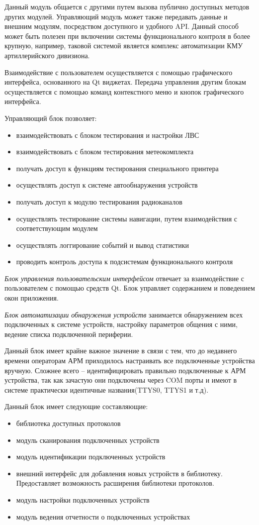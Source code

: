 Данный модуль общается с другими путем вызова публично доступных методов других модулей. Управляющий модуль может также
передавать данные и внешним модулям, посредством доступного и удобного API. Данный способ может быть полезен при
включении системы функционального контроля в более крупную, например, таковой системой является комплекс автоматизации
КМУ артиллерийского дивизиона.

Взаимодействие с пользователем осуществляется с помощью графического интерфейса, основанного на Qt виджетах. Передача
управления другим блокам осуществляется с помощью команд контекстного меню и кнопок графического интерфейса.

Управляющий блок позволяет:
\begin{itemize}
	\item взаимодействовать с блоком тестирования и настройки ЛВС
	\item взаимодействовать с блоком тестирования метеокомплекта
	\item получать доступ к функциям тестирования специального принтера
	\item осуществлять доступ к системе автообнаружения устройств
	\item получать доступ к модулю тестирования радиоканалов
	\item осуществлять тестирование системы навигации, путем взаимодействия с соответствующим модулем
	\item осуществлять логгирование событий и вывод статистики
	\item проводить контроль доступа к подсистемам функционального контроля
\end{itemize}

\textit{Блок управления пользовательским интерфейсом} отвечает за взаимодействие с пользователем с помощью средств Qt.
Блок управляет содержанием и поведением окон приложения.

\textit{Блок автоматизации обнаружения устройств} занимается обнаружением всех подключенных к системе устройств,
настройку параметров общения с ними, ведение списка подключенной периферии.

Данный блок имеет крайне важное значение в связи с тем, что до недавнего времени операторам АРМ приходилось настраивать
все подключенные устройства вручную.
Сложнее всего -- идентифицировать правильно подключенные к АРМ устройства, так как
зачастую они подключены через COM порты и имеют в системе практически идентичные названия(TTYS0, TTYS1 и т.д).

Данный блок имеет следующие составляющие:
\begin{itemize}
		\item библиотека доступных протоколов
		\item модуль сканирования подключенных устройств
		\item модуль идентификации подключенных устройств
		\item внешний интерфейс для добавления новых устройств в библиотеку. Предоставляет возможность расширения библиотеки протоколов.
		\item модуль настройки подключенных устройств
		\item модуль ведения отчетности о подключенных устройствах
\end{itemize}

